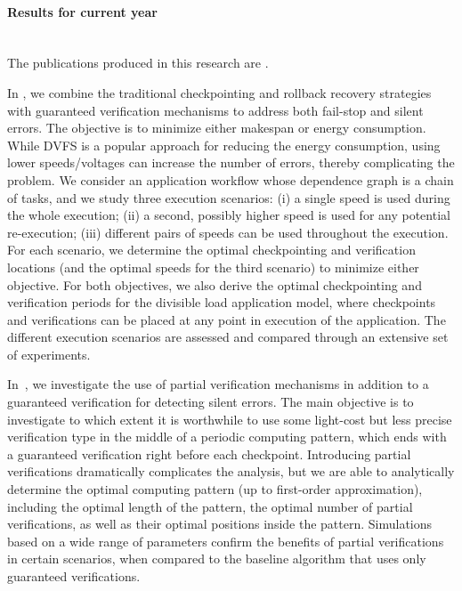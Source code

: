 \begin{refsection}
\paragraph{Results for current year}~\\

The publications produced in this research are \cite{Benoit14_chain, Cavelan15_partialSaurabh, Cavelan15_timing,Gomez14_SDCDetector}.

In \cite{Benoit14_chain}, we combine the traditional checkpointing and rollback recovery strategies with guaranteed verification mechanisms to address both fail-stop and silent errors. The objective is to minimize either makespan or energy consumption. While DVFS is a popular approach for reducing the energy consumption, using lower speeds/voltages can increase the number of errors, thereby complicating the problem. We consider an application workflow whose dependence graph is a chain of tasks, and we study three execution scenarios: (i) a single speed is used during the whole execution; (ii) a second, possibly higher speed is used for any potential re-execution; (iii) different pairs of speeds can be used throughout the execution. For each scenario, we determine the optimal checkpointing and verification locations (and the optimal speeds for the third scenario) to minimize either objective. For both objectives, we also derive the optimal checkpointing and verification periods for the divisible load application model, where checkpoints and verifications can be placed at any point in execution of the application. The different execution scenarios are assessed and compared through an extensive set of experiments.

In~\cite{Cavelan15_partialSaurabh}, we investigate the use of partial verification mechanisms in addition to a guaranteed verification for detecting silent errors. The main objective is to investigate to which extent it is worthwhile to use some light-cost but less precise verification type in the middle of a periodic computing pattern, which ends with a guaranteed verification right before each checkpoint. Introducing partial verifications dramatically complicates the analysis, but we are able to analytically determine the optimal computing pattern (up to first-order approximation), including the optimal length of the pattern, the optimal number of partial verifications, as well as their optimal positions inside the pattern.
Simulations based on a wide range of parameters confirm the benefits of partial verifications in certain scenarios, when compared to the baseline algorithm that uses only guaranteed verifications.


\end{refsection}
